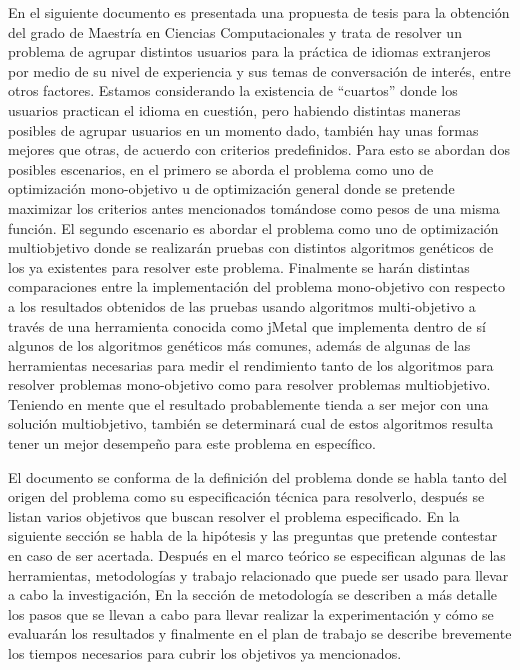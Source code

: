 En el siguiente documento es presentada una propuesta de tesis para la obtención del grado de Maestría en Ciencias Computacionales y trata de resolver un problema de agrupar distintos usuarios para la práctica de idiomas extranjeros por medio de su nivel de experiencia y sus temas de conversación de interés, entre otros factores. Estamos considerando la existencia de “cuartos” donde los usuarios practican el idioma en cuestión, pero habiendo distintas maneras posibles de agrupar usuarios en un momento dado, también hay unas formas mejores que otras, de acuerdo con criterios predefinidos. Para esto se abordan dos posibles escenarios, en el primero se aborda el problema como uno de optimización mono-objetivo u de optimización general donde se pretende maximizar los criterios antes mencionados tomándose como pesos de una misma función. El segundo escenario es abordar el problema como uno de optimización multiobjetivo donde se realizarán pruebas con distintos algoritmos genéticos de los ya existentes para resolver este problema. Finalmente se harán distintas comparaciones entre la implementación del problema mono-objetivo con respecto a los resultados obtenidos de las pruebas usando algoritmos multi-objetivo a través de una herramienta conocida como jMetal que implementa dentro de sí algunos de los algoritmos genéticos más comunes, además de algunas de las herramientas necesarias para medir el rendimiento tanto de los algoritmos para resolver problemas mono-objetivo como para resolver problemas multiobjetivo. Teniendo en mente que el resultado probablemente tienda a ser mejor con una solución multiobjetivo, también se determinará cual de estos algoritmos resulta tener un mejor desempeño para este problema en específico.

El documento se conforma de la definición del problema donde se habla tanto del origen del problema como su especificación técnica para resolverlo, después se listan varios objetivos que buscan resolver el problema especificado. En la siguiente sección se habla de la hipótesis y las preguntas que pretende contestar en caso de ser acertada. Después en el marco teórico se especifican algunas de las herramientas, metodologías y trabajo relacionado que puede ser usado para llevar a cabo la investigación, En la sección de metodología se describen a más detalle los pasos que se llevan a cabo para llevar realizar la experimentación y cómo se evaluarán los resultados y finalmente en el plan de trabajo se describe brevemente los tiempos necesarios para cubrir los objetivos ya mencionados. 